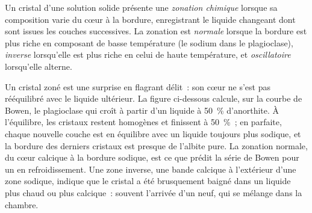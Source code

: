\begin{definition}\label{def:b2:magmatic-differentiation:zoning}
Un cristal d'une solution solide présente une \emph{zonation chimique}
lorsque sa composition varie du cœur à la bordure, enregistrant le liquide changeant
dont sont issues les couches successives. La zonation est \emph{normale} lorsque la bordure est plus riche en
composant de basse température (le sodium dans le plagioclase), \emph{inverse} lorsqu'elle est
plus riche en celui de haute température, et \emph{oscillatoire} lorsqu'elle alterne.
\end{definition}

Un cristal zoné est une  surprise en flagrant délit~: son cœur ne s'est pas
rééquilibré avec le liquide ultérieur. La figure ci-dessous calcule, sur la courbe de Bowen,
le plagioclase qui croît à partir d'un liquide à \qty{50}{\percent} d'anorthite. À
l'équilibre, les cristaux restent homogènes et finissent à \qty{50}{\percent}~; en  parfaite,
chaque nouvelle couche est en équilibre avec un liquide toujours plus sodique,
et la bordure des derniers cristaux est presque de l'albite pure. La zonation normale, du cœur
calcique à la bordure sodique, est ce que prédit la série de Bowen pour un  en refroidissement.
Une zone inverse, une bande calcique à l'extérieur d'une zone sodique, indique que le cristal a été
brusquement baigné dans un liquide plus chaud ou plus calcique~: souvent l'arrivée d'un  neuf,
qui se mélange dans la chambre.

